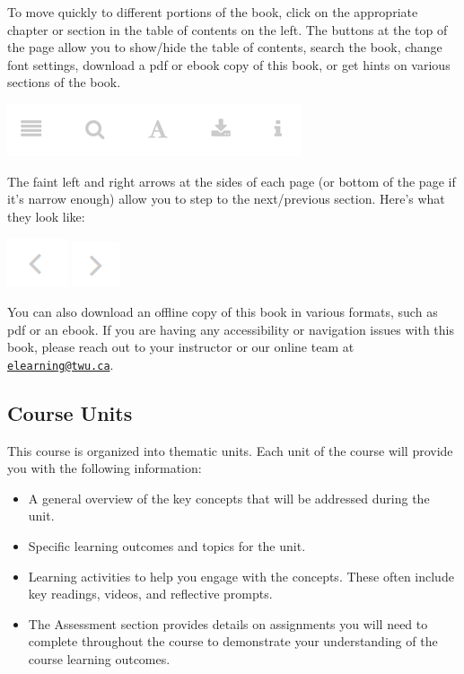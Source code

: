 \documentclass[
]{book}
\providecommand{\tightlist}{%
  \setlength{\itemsep}{0pt}\setlength{\parskip}{0pt}}
\begin{document}
To move quickly to different portions of the book, click on the appropriate chapter or section in the table of contents on the left. The buttons at the top of the page allow you to show/hide the table of contents, search the book, change font settings, download a pdf or ebook copy of this book, or get hints on various sections of the book.

\includegraphics{assets/course-intro/menu.png}

The faint left and right arrows at the sides of each page (or bottom of the page if it's narrow enough) allow you to step to the next/previous section. Here's what they look like:

\includegraphics{assets/course-intro/left_arrow.png} \includegraphics{assets/course-intro/right_arrow.png}

You can also download an offline copy of this book in various formats, such as pdf or an ebook. If you are having any accessibility or navigation issues with this book, please reach out to your instructor or our online team at \href{mailto:elearning@twu.ca}{\nolinkurl{elearning@twu.ca}}.

\hypertarget{course-units}{%
\subsection*{Course Units}\label{course-units}}

This course is organized into thematic units. Each unit of the course will provide you with the following information:

\begin{itemize}
\tightlist
\item
  A general overview of the key concepts that will be addressed during the unit.\\
\item
  Specific learning outcomes and topics for the unit.\\
\item
  Learning activities to help you engage with the concepts. These often include key readings, videos, and reflective prompts.\\
\item
  The Assessment section provides details on assignments you will need to complete throughout the course to demonstrate your understanding of the course learning outcomes.
\end{itemize}
\end{document}
